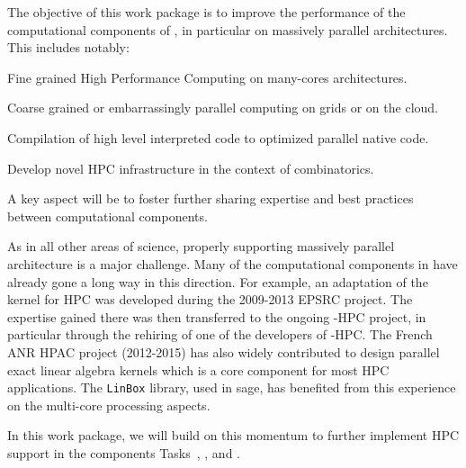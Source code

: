 \begin{workpackage}[id=hpc,wphases=0-48,
  title=High Performance Mathematical Computing,
  title=High Performance Computing,
  lead=UJF,
  PSRM=1, %
  LLRM=12, %
  SARM=18, %
  UKRM=1, %
  UBRM=1, %
  UJFRM=24] %
  
\begin{wpobjectives}
  The objective of this work package is to improve the performance of
  the computational components of \TheProject, in particular on
  massively parallel architectures. This includes notably:
  \begin{compactitem}
  \item Fine grained High Performance Computing on many-cores architectures.
  \item Coarse grained or embarrassingly parallel computing on grids or on the cloud.
  \item Compilation of high level interpreted code to optimized parallel native code.
  \item Develop novel HPC infrastructure in the context of combinatorics.
  \end{compactitem}
  A key aspect will be to foster further sharing expertise and best
  practices between computational components.
\end{wpobjectives}

\begin{wpdescription}
  As in all other areas of science, properly supporting massively
  parallel architecture is a major challenge. Many of the
  computational components in \TheProject have already gone a long way
  in this direction. For example, an adaptation of the \GAP kernel for
  HPC was developed during the 2009-2013 EPSRC project. The expertise
  gained there was then transferred to the ongoing \Singular-HPC
  project, in particular through the rehiring of one of the developers
  of \GAP-HPC. The French ANR HPAC project (2012-2015) has also widely contributed to design
  parallel exact linear algebra kernels  which is a core component for most HPC
  applications. The \texttt{LinBox} library, used in sage, has benefited from this
  experience on the multi-core processing aspects. 

  In this work package, we will build on this momentum to further
  implement HPC support in the components Tasks~,
  , and .



\end{wpdescription}
\end{workpackage}
